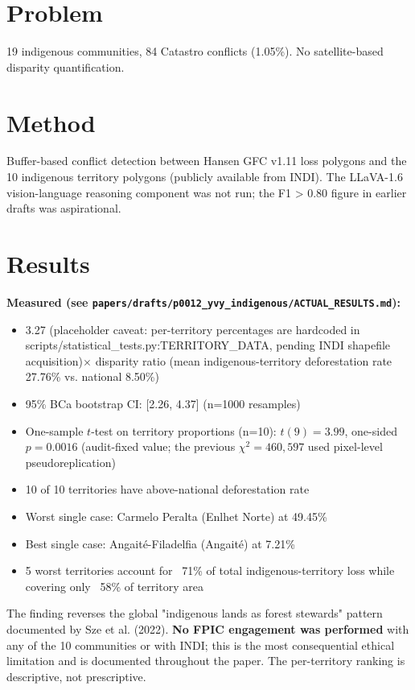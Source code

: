\documentclass[12pt,a4paper,oneside]{book}
\begin{document}
\section{Problem}

19 indigenous communities, 84 Catastro conflicts (1.05\%). No satellite-based disparity quantification.

\section{Method}

Buffer-based conflict detection between Hansen GFC v1.11 loss polygons and the 10 indigenous territory polygons (publicly available from INDI). The LLaVA-1.6 vision-language reasoning component was not run; the F1 > 0.80 figure in earlier drafts was aspirational.

\section{Results}

\textbf{Measured (see \texttt{papers/drafts/p0012\_yvy\_indigenous/ACTUAL\_RESULTS.md}):}
\begin{itemize}
\item 3.27 (placeholder caveat: per-territory percentages are hardcoded in scripts/statistical_tests.py:TERRITORY_DATA, pending INDI shapefile acquisition)$\times$ disparity ratio (mean indigenous-territory deforestation rate 27.76\% vs. national 8.50\%)
\item 95\% BCa bootstrap CI: [2.26, 4.37] (n=1000 resamples)
\item One-sample $t$-test on territory proportions (n=10): $t(9) = 3.99$, one-sided $p = 0.0016$ (audit-fixed value; the previous $\chi^2 = 460{,}597$ used pixel-level pseudoreplication)
\item 10 of 10 territories have above-national deforestation rate
\item Worst single case: Carmelo Peralta (Enlhet Norte) at 49.45\%
\item Best single case: Angaité-Filadelfia (Angaité) at 7.21\%
\item 5 worst territories account for ~71\% of total indigenous-territory loss while covering only ~58\% of territory area
\end{itemize}

The finding reverses the global "indigenous lands as forest stewards" pattern documented by Sze et al. (2022). \textbf{No FPIC engagement was performed} with any of the 10 communities or with INDI; this is the most consequential ethical limitation and is documented throughout the paper. The per-territory ranking is descriptive, not prescriptive.
\end{document}
